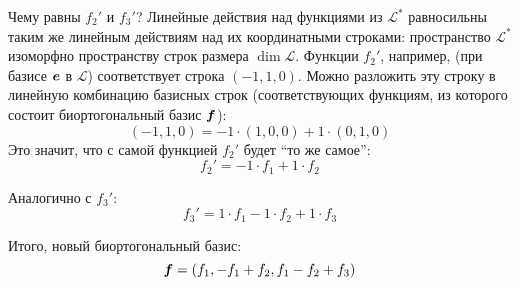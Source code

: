 \documentclass[a4paper,12pt]{article}
\begin{document}
\begin{solution}
    Чему равны $f_2'$ и $f_3'$?
    Линейные действия над функциями из $\mathcal L^*$ равносильны таким же линейным действиям над их координатными строками: пространство $\mathcal L^*$ изоморфно пространству строк размера $\dim\mathcal L$.
    Функции $f_2'$, например, (при базисе $\boldsymbol e$ в $\mathcal L$) соответствует строка $(-1, 1, 0)$.
    Можно разложить эту строку в линейную комбинацию базисных строк (соответствующих функциям, из которого состоит биортогональный базис $\boldsymbol f$):
    \[
      (-1, 1, 0) = -1 \cdot (1, 0, 0) + 1 \cdot (0, 1, 0)
    \]
    Это значит, что с самой функцией $f_2'$ будет ``то же самое'':
    \[
      f_2' = -1 \cdot f_1 + 1 \cdot f_2
    \]
    
    Аналогично с $f_3'$:
    \[
      f_3' = 1 \cdot f_1 - 1 \cdot f_2 + 1 \cdot f_3
    \]
    
    Итого, новый биортогональный базис:
    \[
      \boldsymbol f = (f_1, -f_1 + f_2, f_1 - f_2 + f_3)
    \]
  \end{solution}
\end{document}
